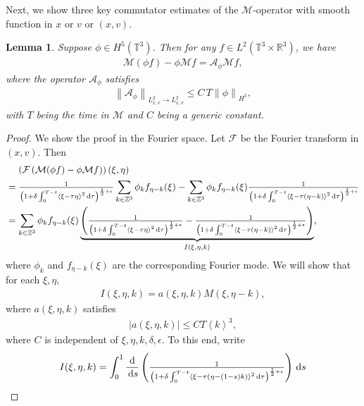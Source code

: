 \documentclass[11pt,american, reqno]{amsart}
\numberwithin{equation}{section}
\newtheorem{lemma}[theorem]{Lemma}
\newcommand{\R}{\mathbb R}
\newcommand{\1}{\mathds{1}}
\newcommand{\ZZ}{{\mathbb{Z}}}
\newcommand{\ds}{\, {\rm d} s}
\newcommand{\CalM}{\mathcal{M}}
\newcommand{\CalA}{\mathcal{A}}
\newcommand{\CalF}{\mathcal{F}}
\newcommand{\dtau}{\, {\rm d} \tau}
\newcommand{\vpran}[1]{\left(#1\right)}
\newcommand{\Eps}{\epsilon}
\newcommand{\norm}[1]{\left\lVert#1\right\rVert}
\newcommand{\vint}[1]{\left\langle#1\right\rangle}
\newcommand{\T}{\mathbb{T}}
\numberwithin{equation}{section}
\begin{document}
Next, we show three key commutator estimates of the $\CalM$-operator with smooth function in $x$ or $v$ or $(x, v)$. 
\begin{lemma} \label{lem:M-comm-x}
Suppose $\phi \in H^5(\T^3)$. Then for any $f \in L^2(\T^3 \times \R^3)$, we have
\begin{align*}
  \CalM (\phi f) - \phi \CalM f
= \CalA_\phi \CalM f,
\end{align*}
where the operator $\CalA_\phi$ satisfies
\begin{align} \label{bound:toy-commut}
  \norm{\CalA_\phi}_{L^2_{x, v} \to L^2_{x,v}} 
\leq
  C \, T \norm{\phi}_{H^5},
\end{align}
with $T$ being the time in $\CalM$ and $C$ being a generic constant. 
\end{lemma}
\begin{proof}
We show the proof in the Fourier space. Let $\CalF$ be the Fourier transform in $(x, v)$. Then
\begin{align*}
& \quad \,
  \vpran{\CalF \vpran{\CalM (\phi f) - \phi \CalM f}}(\xi, \eta)
\\
&= \tfrac{1}{\vpran{1 + \delta \int_0^{T-t} \vint{\xi - \tau \eta}^2 \dtau}^{\frac{1}{2}+\Eps}}
\sum_{k \in \ZZ^3} \phi_k f_{\eta-k} (\xi)
- \sum_{k \in \ZZ^3} \phi_k f_{\eta-k} (\xi)
\tfrac{1}{\vpran{1 + \delta \int_0^{T-t} \vint{\xi - \tau (\eta-k)}^2 \dtau}^{\frac{1}{2}+\Eps}}
\\
& = \sum_{k \in \ZZ^3} \phi_k f_{\eta-k} (\xi)
\underbrace{\vpran{\tfrac{1}{\vpran{1 + \delta \int_0^{T-t} \vint{\xi - \tau \eta}^2 \dtau}^{\frac{1}{2}+\Eps}}
- \tfrac{1}{\vpran{1 + \delta \int_0^{T-t} \vint{\xi - \tau (\eta-k)}^2 \dtau}^{\frac{1}{2}+\Eps}}}}_{I(\xi, \eta, k)},
\end{align*}
where $\phi_k$ and $f_{\eta-k} (\xi)$ are the corresponding Fourier mode. We will show that for each $\xi, \eta$,
\begin{align*}
  I(\xi, \eta, k) = a(\xi, \eta, k) M(\xi, \eta - k),
\end{align*}
where $a(\xi, \eta, k)$ satisfies
\begin{align} \label{bound:toy-M-diff}
  |a(\xi, \eta, k)| 
\leq 
  C T \vint{k}^3, 
\end{align}
where $C$ is independent of $\xi, \eta, k, \delta, \epsilon$. To this end, write
\begin{align*}
 I (\xi, \eta, k)
&= \int_0^1 
 \frac{\rm d}{\ds} 
\vpran{\tfrac{1}{\vpran{1 + \delta \int_0^{T-t} \vint{\xi - \tau (\eta - (1-s) k)}^2 \dtau}^{\frac{1}{2}+\Eps}}} \ds
\\

\end{align*}
\end{proof}
\end{document}
